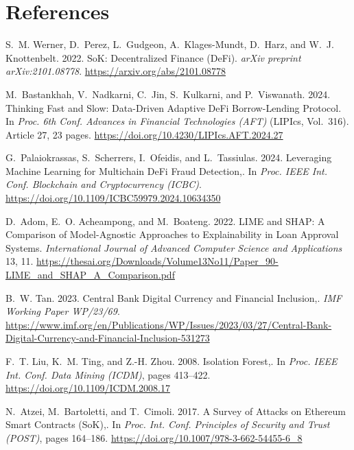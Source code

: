 \chapter*{References}
{}

{\small
\begin{enumerate}[label={[\arabic*]}]
\setlength{\itemsep}{4pt}
\setlength{\parsep}{0pt}
\setlength{\parskip}{0pt}
\item S.~M. Werner, D.~Perez, L.~Gudgeon, A.~Klages-Mundt, D.~Harz, and W.~J. Knottenbelt. 2022. SoK: Decentralized Finance (DeFi). \emph{arXiv preprint arXiv:2101.08778}. \url{https://arxiv.org/abs/2101.08778}

\item M.~Bastankhah, V.~Nadkarni, C.~Jin, S.~Kulkarni, and P.~Viswanath. 2024. Thinking Fast and Slow: Data-Driven Adaptive DeFi Borrow-Lending Protocol. In \emph{Proc. 6th Conf. Advances in Financial Technologies (AFT)} (LIPIcs, Vol.~316). Article 27, 23 pages. \url{https://doi.org/10.4230/LIPIcs.AFT.2024.27}

\item G.~Palaiokrassas, S.~Scherrers, I.~Ofeidis, and L.~Tassiulas. 2024. Leveraging Machine Learning for Multichain DeFi Fraud Detection,. In \emph{Proc. IEEE Int. Conf. Blockchain and Cryptocurrency (ICBC)}. \url{https://doi.org/10.1109/ICBC59979.2024.10634350}

\item D.~Adom, E.~O. Acheampong, and M.~Boateng. 2022. LIME and SHAP: A Comparison of Model-Agnostic Approaches to Explainability in Loan Approval Systems. \emph{International Journal of Advanced Computer Science and Applications} 13, 11. \url{https://thesai.org/Downloads/Volume13No11/Paper_90-LIME_and_SHAP_A_Comparison.pdf}

\item B.~W. Tan. 2023. Central Bank Digital Currency and Financial Inclusion,. \emph{IMF Working Paper WP/23/69}. \url{https://www.imf.org/en/Publications/WP/Issues/2023/03/27/Central-Bank-Digital-Currency-and-Financial-Inclusion-531273}

\item F.~T. Liu, K.~M. Ting, and Z.-H. Zhou. 2008. Isolation Forest,. In \emph{Proc. IEEE Int. Conf. Data Mining (ICDM)}, pages 413--422. \url{https://doi.org/10.1109/ICDM.2008.17}

\item N.~Atzei, M.~Bartoletti, and T.~Cimoli. 2017. A Survey of Attacks on Ethereum Smart Contracts (SoK),. In \emph{Proc. Int. Conf. Principles of Security and Trust (POST)}, pages 164--186. \url{https://doi.org/10.1007/978-3-662-54455-6_8}


\end{enumerate}}
